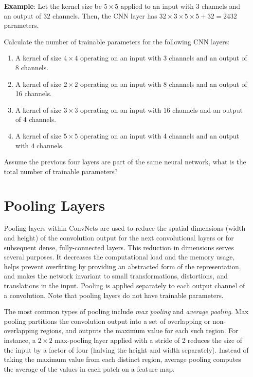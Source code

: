 \textbf{Example}: Let the kernel size be $5 \times 5$ applied to an input with $3$ channels and an output of $32$ channels. Then, the CNN layer has $32 \times 3 \times 5 \times 5 + 32 = 2432$ parameters.


\begin{exerciseboxpaper}
Calculate the number of trainable parameters for the following CNN layers:
\begin{enumerate}
\item A kernel of size $4 \times 4$ operating on an input with 3 channels and an output of 8 channels.
\item A kernel of size $2 \times 2$ operating on an input with 8 channels and an output of 16 channels.
\item A kernel of size $3 \times 3$ operating on an input with 16 channels and an output of 4 channels.
\item A kernel of size $5 \times 5$ operating on an input with 4 channels and an output with 4 channels.
\end{enumerate}
Assume the previous four layers are part of the same neural network, what is the total number of trainable parameters?
\end{exerciseboxpaper}


\section{Pooling Layers}

Pooling layers within ConvNets are used to reduce the spatial dimensions (width and height) of the convolution output for the next convolutional layers or for subsequent dense, fully-connected layers. This reduction in dimensions serves several purposes. It decreases the computational load and the memory usage, helps prevent overfitting by providing an abstracted form of the representation, and makes the network invariant to small transformations, distortions, and translations in the input. Pooling is applied separately to each output channel of a convolution. Note that pooling layers do not have trainable parameters.

The most common types of pooling include \emph{max pooling} and \emph{average pooling}. Max pooling partitions the convolution output into a set of overlapping or non-overlapping regions, and outputs the maximum value for each such region. For instance, a $2 \times 2$ max-pooling layer applied with a stride of 2 reduces the size of the input by a factor of four (halving the height and width separately). Instead of taking the maximum value from each distinct region, average pooling computes the average of the values in each patch on a feature map. 

